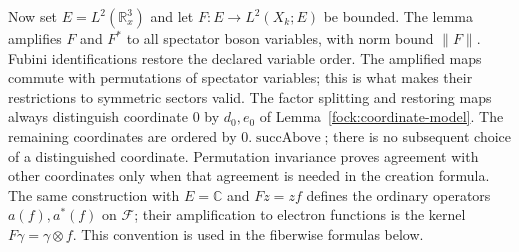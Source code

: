 \documentclass[11pt,a4paper]{article}
\theoremstyle{definition}
\theoremstyle{remark}
\begin{document}
Now set $E=L^2(\mathbb R^3_x)$ and let
$F:E\to L^2(X_k;E)$ be bounded. The lemma amplifies $F$ and $F^*$
to all spectator boson variables, with norm bound $\|F\|$.
Fubini identifications restore the declared variable order. The
amplified maps commute with permutations of spectator variables;
this is what makes their restrictions to symmetric sectors valid.
The factor splitting and restoring maps always distinguish coordinate
$0$ by $d_0,e_0$ of Lemma~\ref{fock:coordinate-model}.
The remaining coordinates are ordered by $0.\operatorname{succAbove}$;
there is no subsequent choice of a distinguished coordinate.
Permutation invariance proves agreement with other coordinates
only when that agreement is needed in the creation formula.
The same construction with
$E=\mathbb C$ and $Fz=zf$ defines the ordinary operators $a(f),a^*(f)$ on $\mathcal F$; their amplification
to electron functions is the kernel $F\gamma=\gamma\otimes f$.
This convention is used in the fiberwise formulas below.
\end{document}
